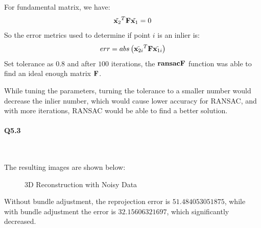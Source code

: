 \documentclass[11pt]{article} \usepackage{fullpage} \usepackage{graphicx} \usepackage{epstopdf} \usepackage{color} \usepackage{psfrag} \usepackage{pdfsync}\usepackage{indentfirst}\usepackage{subfigure}\usepackage{float}\usepackage[section]{placeins}
\begin{document}
For fundamental matrix, we have:
\begin{equation}
	\tilde{\bold{x}_2}^T\bold{F}\tilde{\bold{x}_1} = 0
\end{equation}
So the error metrics used to determine if point $i$ is an inlier is:
\begin{equation}
	err = abs\left(\tilde{\bold{x}_{2i}}^T\bold{F}\tilde{\bold{x}_{1i}}\right)
\end{equation}
Set tolerance as $0.8$ and after $100$ iterations, the $\bold{ransacF}$ function was able to find an ideal enough matrix $\bold{F}$.

While tuning the parameters, turning the tolerance to a smaller number would decrease the inlier number, which would cause lower accuracy for RANSAC, and with more iterations, RANSAC would be able to find a better solution.

\paragraph{Q5.3}~{}

The resulting images are shown below:
\begin{figure}[H]
\centering
{}
\caption{3D Reconstruction with Noisy Data}
\end{figure}

Without bundle adjustment, the reprojection error is $51.484053051875$, while with bundle adjustment the error is $32.15606321697$, which significantly decreased.
\end{document}
